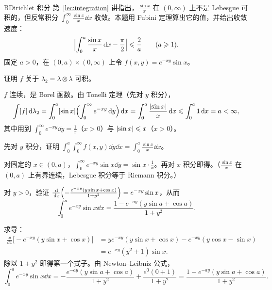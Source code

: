 \begin{probleme}{B}{Dirichlet 积分}
第~\ref{lec:integration} 讲指出，$\frac{\sin x}x$ 在 $(0,\infty)$ 上不是 Lebesgue 可积的，但反常积分 $\int_0^\infty\frac{\sin x}x\dd x$ 收敛。本题用 Fubini 定理算出它的值，并给出收敛速度：
\[
\Bigl\lvert\int_0^a\frac{\sin x}x\,\mathrm{d} x-\frac\pi2\Bigr\rvert\leqslant\frac2a\qquad(a\geqslant1).
\]
固定 $a>0$，在 $(0,a)\times(0,\infty)$ 上令 $f(x,y)=e^{-xy}\sin x$。
\begin{questions}
\item 证明 $f$ 关于 $\lambda_2=\lambda\otimes\lambda$ 可积。
\begin{solution}
$f$ 连续，是 Borel 函数。由 Tonelli 定理（先对 $y$ 积分），
\[
\int\lvert f\rvert\,\mathrm{d}\lambda_2=\int_0^a\lvert \sin x\rvert\Bigl(\int_0^\infty e^{-xy}\,\mathrm{d} y\Bigr)\,\mathrm{d} x=\int_0^a\frac{\lvert \sin x\rvert}x\,\mathrm{d} x\leqslant\int_0^a1\,\mathrm{d} x=a<\infty,
\]
其中用到 $\int_0^\infty e^{-xy}\dd y=\frac1x$（$x>0$）与 $\lvert \sin x\rvert\leqslant x$（$x>0$）。
\end{solution}

\item 先对 $y$ 积分，证明 $\int_0^a\int_0^\infty f(x,y)\dd y\dd x=\int_0^a\frac{\sin x}x\dd x$。
\begin{solution}
对固定的 $x\in(0,a)$，$\int_0^\infty e^{-xy}\sin x\dd y=\sin x\cdot\frac1x$。再对 $x$ 积分即得。（$\frac{\sin x}x$ 在 $(0,a)$ 上有界连续，Lebesgue 积分等于 Riemann 积分。）
\end{solution}

\item 对 $y>0$，验证 $\frac{\,\mathrm{d}}{\,\mathrm{d} x}\Bigl(-\frac{e^{-xy}(y\sin x+\cos x)}{1+y^2}\Bigr)=e^{-xy}\sin x$，从而
\[
\int_0^ae^{-xy}\sin x\dd x=\frac{1-e^{-ay}(y\sin a+\cos a)}{1+y^2}.
\]
\begin{solution}
求导：
\[
\begin{aligned}
\frac{\dd}{\dd x}\bigl[-e^{-xy}(y\sin x+\cos x)\bigr]&=ye^{-xy}(y\sin x+\cos x)-e^{-xy}(y\cos x-\sin x)\\
&=e^{-xy}(y^2+1)\sin x .
\end{aligned}
\]
除以 $1+y^2$ 即得第一个式子。由 Newton--Leibniz 公式，
\[
\int_0^ae^{-xy}\sin x\dd x=-\frac{e^{-ay}(y\sin a+\cos a)}{1+y^2}+\frac{e^0(0+1)}{1+y^2}=\frac{1-e^{-ay}(y\sin a+\cos a)}{1+y^2}.
\]
\end{solution}


\end{questions}
\end{probleme}

